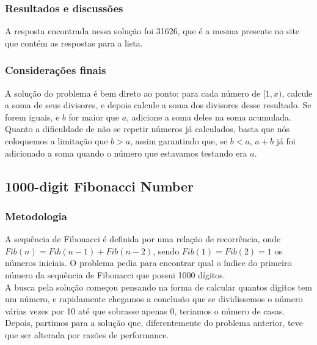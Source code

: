 \documentclass{article}
\begin{document}
        \subsubsection{Resultados e discussões}
        A resposta encontrada nessa solução foi 31626, que é a mesma presente no site que contém as respostas para a lista.
        
        \subsubsection{Considerações finais}
        A solução do problema é bem direto ao ponto: para cada número de $[1, x)$, calcule a soma de seus divisores, e depois calcule a soma dos divisores desse resultado. Se forem iguais, e $b$ for maior que $a$, adicione a soma deles na soma acumulada.\\
        Quanto a dificuldade de não se repetir números já calculados, basta que nós coloquemos a limitação que $b > a$, assim garantindo que, se $b < a$, $a + b$ já foi adicionado a soma quando o número que estavamos testando era $a$.

    \subsection{1000-digit Fibonacci Number}
        
        \subsubsection{Metodologia}
        A sequência de Fibonacci é definida por uma relação de recorrência, onde $Fib(n) = Fib(n - 1) + Fib(n - 2)$, sendo $Fib(1) = Fib(2) = 1$ os números iniciais.
        O problema pedia para encontrar qual o índice do primeiro número da sequência de Fibonacci que possui 1000 dígitos.\\
        A busca pela solução começou pensando na forma de calcular quantos digitos tem um número, e rapidamente chegamos a conclusão que se dividissemos o número várias vezes por 10 até que sobrasse apenas 0, teriamos o número de casas. Depois, partimos para a solução que, diferentemente do problema anterior, teve que ser alterada por razões de performance.
        
\end{document}
